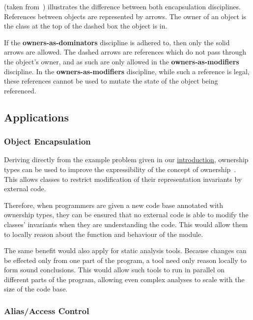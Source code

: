 \documentclass{acm_proc_article-sp}
\begin{document}
 (taken from~\cite{dietl09gut})
illustrates the difference between both encapsulation disciplines. References
between objects are represented by arrows. The owner of an object is the class
at the top of the dashed box the object is in.

If the \textbf{owners-as-dominators} discipline is adhered to, then \linebreak
only the solid arrows are allowed. The dashed arrows are references which do
not pass through the object's owner, and as such are only allowed in the
\textbf{owners-as-modifiers} discipline. In the \textbf{owners-as-modifiers}
discipline, while such a reference is legal, these references cannot be used to
mutate the state of the object being referenced.

\subsection{Applications}
\label{subsec:applications}

\subsubsection{Object Encapsulation}
\label{subsubsec:object_encapsulation}

Deriving directly from the example problem given in our
\hyperref[code:modular_reasoning_car_engine_1]{introduction}, ownership types
can be used to improve the expressibility of the concept of
ownership~\cite{clarke98ownership}. This allows classes to restrict
modification of their representation invariants by external code.

Therefore, when programmers are given a new code base annotated with ownership
types, they can be ensured that no external code is able to modify the classes'
invariants when they are understanding the code. This would allow them to
locally reason about the function and behaviour of the module.

The same benefit would also apply for static analysis tools. Because changes can
be effected only from one part of the program, a tool need only reason locally
to form sound conclusions. This would allow such tools to run in parallel on
different parts of the program, allowing even complex analyses to scale with the
size of the code base.

\subsubsection{Alias/Access Control}
\label{subsubsec:alias_control}
\end{document}
